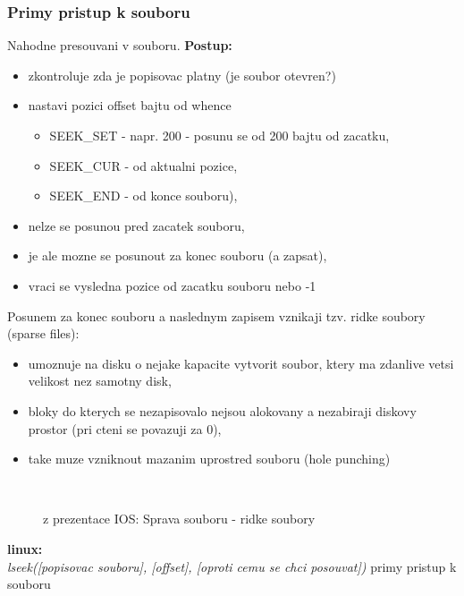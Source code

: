 \documentclass[a4paper, 11pt]{article}
\begin{document}
\subsubsection{Primy pristup k souboru}
Nahodne presouvani v souboru. \textbf{Postup:}
\begin{itemize}
    \item zkontroluje zda je popisovac platny (je soubor otevren?)
    \item nastavi pozici offset bajtu od whence
    \begin{itemize}
        \item SEEK\_SET - napr. 200 - posunu se od 200 bajtu od zacatku,
        \item SEEK\_CUR - od aktualni pozice,
        \item SEEK\_END - od konce souboru),
    \end{itemize}
    \item nelze se posunou pred zacatek souboru,
    \item je ale mozne se posunout za konec souboru (a zapsat),
    \item vraci se vysledna pozice od zacatku souboru nebo -1 \\
\end{itemize}

Posunem za konec souboru a naslednym zapisem vznikaji tzv. ridke soubory (sparse files):
\begin{itemize}
    \item umoznuje na disku o nejake kapacite vytvorit soubor, ktery ma zdanlive vetsi velikost nez samotny disk,
    \item bloky do kterych se nezapisovalo nejsou alokovany a nezabiraji diskovy prostor (pri cteni se povazuji za 0),
    \item take muze vzniknout mazanim uprostred souboru (hole punching) \\
\end{itemize}

\begin{figure} [h]
    \centering
     \\
    \caption{z prezentace IOS: Sprava souboru - ridke soubory} 
\end{figure}

\textbf{linux:} \\[0.5em]
\textit{lseek([popisovac souboru], [offset], [oproti cemu se chci posouvat])} primy pristup k souboru \\
\end{document}

